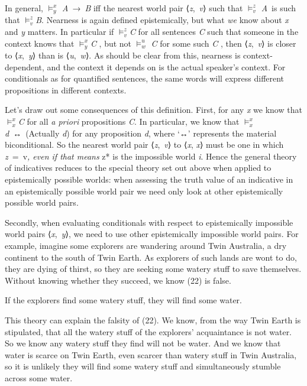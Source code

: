 \documentclass[
  11pt,
  letterpaper,
  DIV=11,
  numbers=noendperiod,
  twoside]{scrartcl}
\providecommand{\tightlist}{%
  \setlength{\itemsep}{0pt}\setlength{\parskip}{0pt}}
\begin{document}
In general, \(\vDash_y^x\) \emph{A}~→~\emph{B} iff the nearest world
pair ⟨\emph{z},~\emph{v}⟩ such that \(\vDash_v^z\) \emph{A}~is such that
\(\vDash_v^z\)\emph{B}. Nearness is again defined epistemically, but
what \emph{we} know about \emph{x} and \emph{y} matters. In particular
if \(\vDash_v^z\)\emph{C} for all sentences \emph{C} such that someone
in the context knows that \(\vDash_y^x\)\emph{C} , but not
\(\vDash_w^u\) \emph{C} for some such \emph{C} , then
⟨\emph{z},~\emph{v}⟩ is closer to ⟨\emph{x},~\emph{y}⟩ than is
⟨\emph{u},~\emph{w}⟩. As should be clear from this, nearness is
context-dependent, and the context it depends on is the actual speaker's
context. For conditionals as for quantified sentences, the same words
will express different propositions in different contexts.

Let's draw out some consequences of this definition. First, for any
\emph{x} we know that \(\vDash_x^x\)\emph{C} for all \emph{a priori}
propositions \emph{C}. In particular, we know that
\(\vDash_x^x\)\emph{d}~↔~(Actually \emph{d}) for any proposition
\emph{d}, where `↔' represents the material biconditional. So the
nearest world pair ⟨\emph{z},~\emph{v}⟩ to ⟨\emph{x}, \emph{x}⟩ must be
one in which \emph{z}~=~v\emph{, even if that means }z* is the
impossible world \emph{i}. Hence the general theory of indicatives
reduces to the special theory set out above when applied to
epistemically possible worlds: when assessing the truth value of an
indicative in an epistemically possible world pair we need only look at
other epistemically possible world pairs.

Secondly, when evaluating conditionals with respect to epistemically
impossible world pairs ⟨\emph{x},~\emph{y}⟩, we need to use other
epistemically impossible world pairs. For example, imagine some
explorers are wandering around Twin Australia, a dry continent to the
south of Twin Earth. As explorers of such lands are wont to do, they are
dying of thirst, so they are seeking some watery stuff to save
themselves. Without knowing whether they succeed, we know (22) is false.

\begin{description}
\tightlist
\item[(22)]
If the explorers find some watery stuff, they will find some water.
\end{description}

This theory can explain the falsity of (22). We know, from the way Twin
Earth is stipulated, that all the watery stuff of the explorers'
acquaintance is not water. So we know any watery stuff they find will
not be water. And we know that water is scarce on Twin Earth, even
scarcer than watery stuff in Twin Australia, so it is unlikely they will
find some watery stuff and simultaneously stumble across some water.
\end{document}
